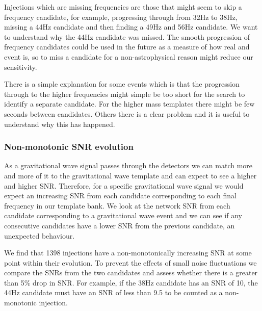 Injections which are missing frequencies are those that might seem to skip a frequency candidate, for example, progressing through from 32Hz to 38Hz, missing a 44Hz candidate and then finding a 49Hz and 56Hz candidate. We want to understand why the 44Hz candidate was missed. The smooth progression of frequency candidates could be used in the future as a measure of how real and event is, so to miss a candidate for a non-astrophysical reason might reduce our sensitivity.

There is a simple explanation for some events which is that the progression through to the higher frequencies might simple be too short for the search to identify a separate candidate. For the higher mass templates there might be few seconds between candidates. Others there is a clear problem and it is useful to understand why this has happened.


\subsubsection{\label{6:sec:non-mono-snr}Non-monotonic SNR evolution}



As a gravitational wave signal passes through the detectors we can match more and more of it to the gravitational wave template and can expect to see a higher and higher SNR. Therefore, for a specific gravitational wave signal we would expect an increasing SNR from each candidate corresponding to each final frequency in our template bank. We look at the network SNR from each candidate corresponding to a gravitational wave event and we can see if any consecutive candidates have a lower SNR from the previous candidate, an unexpected behaviour.

We find that 1398 injections have a non-monotonically increasing SNR at some point within their evolution. To prevent the effects of small noise fluctuations we compare the SNRs from the two candidates and assess whether there is a greater than 5\% drop in SNR. For example, if the 38Hz candidate has an SNR of 10, the 44Hz candidate must have an SNR of less than 9.5 to be counted as a non-monotonic injection.

